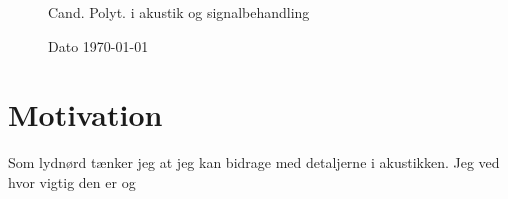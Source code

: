 \documentclass{my_application}
\begin{document}
%
%
\begin{figure}[!ht]
\begin{minipage}[t][1 pt]{.69\textwidth}%
	\Large{Cand. Polyt. i akustik og signalbehandling}
\end{minipage}
\hfill%
\begin{minipage}[t][1 pt][b]{.29\textwidth}
	\vfill
	\hfill Dato \today
\end{minipage}%
\end{figure}
%
\section{Motivation}

Som lydnørd tænker jeg at jeg kan bidrage med detaljerne i akustikken. Jeg ved hvor vigtig den er og 



\end{document}
